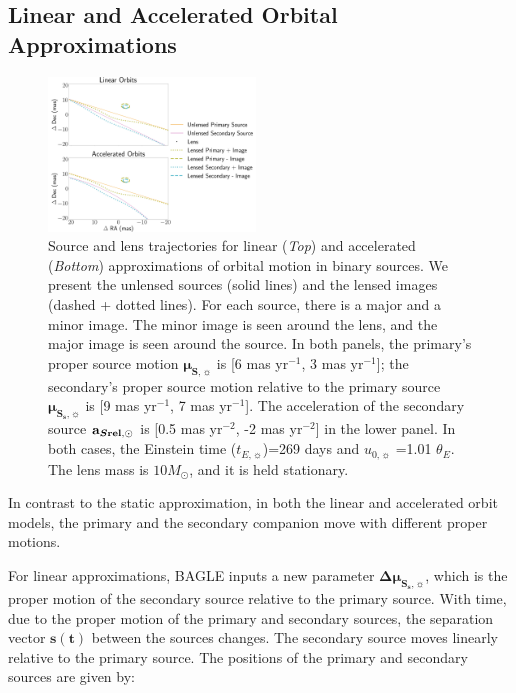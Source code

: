 \documentclass[twocolumn]{aastex701}
\newcommand{\vect}[1]{\boldsymbol{#1}}
\newcommand{\accSsec}{\bold{a}_{\boldsymbol{S\mathrm{rel}},\sun}}
\newcommand{\tE}{t_{E,\sun}}
\newcommand{\thetaE}{\theta_E}
\newcommand{\uo}{u_{0,\sun}}
\newcommand{\musvec}{\vect{\mu}_{\boldsymbol{S},\sun}}
\newcommand{\mussvec}{\vect{\mu}_{\boldsymbol{S_s},\sun}}
\newcommand{\deltamussvec}{\vect{\Delta\mu}_{\boldsymbol{S_s},\sun}}
\begin{document}
\subsection{Linear and Accelerated Orbital Approximations}
\label{sec:binsources_lin}

\begin{figure}
    \centering
    \includegraphics[width=0.49\textwidth]{figures/linorbs.png}
    \caption{Source and lens trajectories for linear (\emph{Top}) and accelerated (\emph{Bottom}) approximations of orbital motion in binary sources. We present the unlensed sources (solid lines) and the lensed images (dashed + dotted lines). For each source, there is a major and a minor image. The minor image is seen around the lens, and the major image is seen around the source. In both panels, the primary's proper source motion $\musvec$ is [6 mas yr$^{-1}$, 3 mas yr$^{-1}$]; the secondary's proper source motion relative to the primary source $\mussvec$ is [9 mas yr$^{-1}$, 7 mas yr$^{-1}$]. The acceleration of the secondary source $\accSsec$ is [0.5  mas yr$^{-2}$, -2  mas yr$^{-2}$] in the lower panel. In both cases, the Einstein time ($\tE$)=269 days and $\uo$ =1.01 $\thetaE$. The lens mass is $10 M_\odot$, and it is held stationary.}
    
    \label{fig:bspl_linacc}
\end{figure}

In contrast to the static approximation, in both the linear and accelerated orbit models, the primary and the secondary companion move with different proper motions. 

For linear approximations, BAGLE inputs a new parameter $\deltamussvec$, which is the proper motion of the secondary source relative to the primary source. With time, due to the proper motion of the primary and secondary sources, the separation vector $\vect{s(t)}$ between the sources changes. The secondary source moves linearly relative to the primary source. The positions of the primary and secondary sources are given by:
\end{document}
